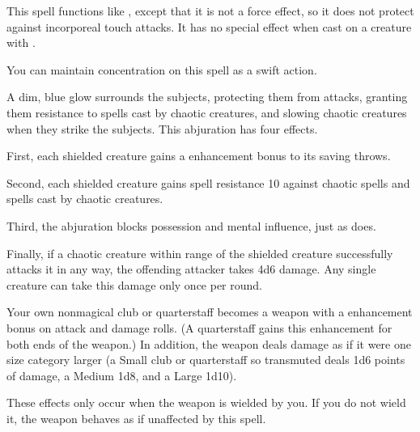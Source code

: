 \begin{spelleffect}
  This spell functions like , except that it is not a force effect, so it does not protect against incorporeal touch attacks. It has no special effect when cast on a creature with .
\end{spelleffect}
\begin{spelleffect}
  You can maintain concentration on this spell as a swift action.
\end{spelleffect}

\begin{spelleffect}
  A dim, blue glow surrounds the subjects, protecting them from attacks, granting them resistance to spells cast by chaotic creatures, and slowing chaotic creatures when they strike the subjects. This abjuration has four effects.
  \par First, each shielded creature gains a  enhancement bonus to its saving throws.
  \par Second, each shielded creature gains spell resistance 10 against chaotic spells and spells cast by chaotic creatures.
  \par Third, the abjuration blocks possession and mental influence, just as  does.
  \par Finally, if a chaotic creature within \rngmed range of the shielded creature successfully attacks it in any way, the offending attacker takes 4d6 damage. Any single creature can take this damage only once per round.
\end{spelleffect}

\spelldur{\durshort}
\begin{spelleffect}
  Your own nonmagical club or quarterstaff becomes a weapon with a  enhancement bonus on attack and damage rolls. \bonusscalingdescription (A quarterstaff gains this enhancement for both ends of the weapon.) In addition, the weapon deals damage as if it were one size category larger (a Small club or quarterstaff so transmuted deals 1d6 points of damage, a Medium 1d8, and a Large 1d10).
\end{spelleffect}
\begin{spellnotes}
  These effects only occur when the weapon is wielded by you. If you do not wield it, the weapon behaves as if unaffected by this spell.
\end{spellnotes}

